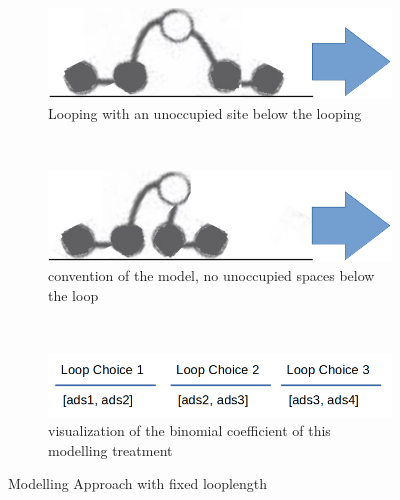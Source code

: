\documentclass[10pt,letterpaper]{article}
\begin{document}
\begin{figure}[h!]
	\centering
	\begin{subfigure}[b]{0.3\textwidth}
		\centering
		\includegraphics[scale=0.2]{loopnorm.png}
		\caption{Looping with an unoccupied site below the looping}
		\label{loop and train}
		\end{subfigure}~~~~~~~~
		\begin{subfigure}[b]{0.3\textwidth}
			\centering
			\includegraphics[scale=0.2]{loopsquished.png}
			\caption{convention of the model, no unoccupied spaces below the loop}
			\label{loop and train}
		\end{subfigure}~~~~~~~~
		\begin{subfigure}[b]{0.3\textwidth}
			\centering
			\includegraphics[scale=0.2]{loopschoices.png}
			\caption{visualization of the binomial coefficient of this modelling treatment}
			\label{loop}
	\end{subfigure}
	\caption{Modelling Approach with fixed looplength}
\end{figure}
\end{document}
